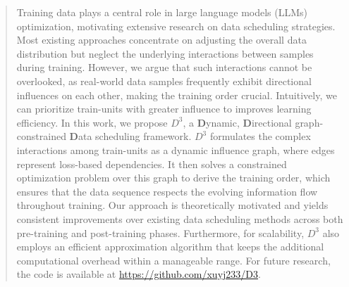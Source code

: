 \begin{abstract}
Training data plays a central role in large language models (LLMs) optimization, motivating extensive research on data scheduling strategies.
Most existing approaches concentrate on adjusting the overall data distribution but neglect the underlying interactions between samples during training. 
However, we argue that such interactions cannot be overlooked, as real-world data samples frequently exhibit directional influences on each other, making the training order crucial. 
Intuitively, we can prioritize train-units with greater influence to improves learning efficiency.
In this work, we propose $D^3$, a \textbf{D}ynamic, \textbf{D}irectional graph-constrained \textbf{D}ata scheduling framework. $D^3$ formulates the complex interactions among train-units as a dynamic influence graph, where edges represent loss-based dependencies. It then solves a constrained optimization problem over this graph to derive the training order, which ensures that the data sequence respects the evolving information flow throughout training.
Our approach is theoretically motivated and yields consistent improvements over existing data scheduling methods across both pre-training and post-training phases. Furthermore, for scalability, $D^3$ also employs an efficient approximation algorithm that keeps the additional computational overhead within a manageable range. For future research, the code is available at \url{https://github.com/xuyj233/D3}.
\end{abstract}